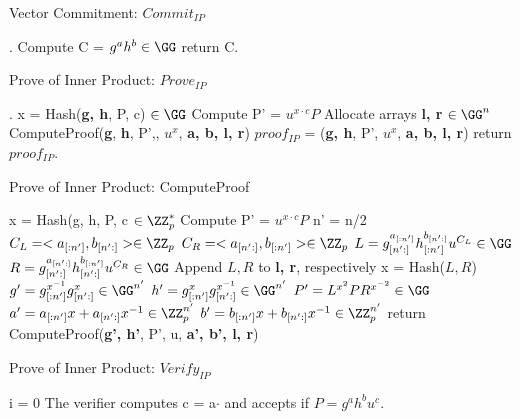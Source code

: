 \begin{algorithm}
 \DontPrintSemicolon
    \caption{Vector Commitment: $Commit_{IP}$}
    \label{alg:vector_commitment}
    \LinesNumbered
    
    .
    Compute C = $g^ah^b \in \GG$ \;
    return C.
\end{algorithm}

\begin{algorithm}
 \DontPrintSemicolon
    \caption{Prove of Inner Product: $Prove_{IP}$}
    \label{alg:prove_ip}
    \LinesNumbered
    
    .
    x = Hash(\textbf{g, h}, P, c) $\in \GG$ \;
    Compute P' = $u^{x\cdot c}P$ \;
    Allocate arrays \textbf{l, r} $\in \GG^n$ \;
    ComputeProof(\textbf{g}, \textbf{h}, P',, $u^x$, \textbf{a, b, l, r})\;
    $proof_{IP}$ = (\textbf{g, h}, P', $u^x$, \textbf{a, b, l, r}) \; 
    return $proof_{IP}$.
\end{algorithm}

\begin{algorithm}
    \caption{Prove of Inner Product: ComputeProof}
    \label{alg:compute_proof}
    \LinesNumbered
    x = Hash(g, h, P, c $\in \ZZ_p^*$\;
    Compute P' = $u^{x\cdot c}P$ \;
     {
        n' = n/2 \;
        $C_L = <a_{[:n']}, b_{[n':]}> \in \ZZ_p$\;
        $C_R = <a_{[n':]}, b_{[:n']}> \in \ZZ_p$\;
        $L = g_{[n':]}^{a_{[:n']}} h_{[:n']}^{b_{[n':]}}u^{C_L} \in \GG$ \;
        $R = g_{[n':]}^{a_{[n':]}} h_{[n':]}^{b_{[:n']}}u^{C_R} \in \GG$ \;
        Append $L, R$ to \textbf{l, r}, respectively\;
        x = Hash($L, R$)\;
        $g' = g_{[:n']}^{x^{-1}} g_{[n':]}^{x} \in \GG^{n'}$ \;
        $h' = g_{[:n']}^{x} g_{[n':]}^{x^{-1}} \in \GG^{n'}$ \;
        $P' = L^{x^2}PR^{x^{-2}} \in \GG$ \;
        $a' = a_{[:n']}x + a_{[n':]}x^{-1} \in \ZZ_p^{n'}$ \;
        $b' = b_{[:n']}x + b_{[n':]}x^{-1} \in \ZZ_p^{n'}$ \;
        return ComputeProof(\textbf{g', h'}, P', u, \textbf{a', b', l, r})
    }
\end{algorithm}

\begin{algorithm}
 \DontPrintSemicolon
    \caption{Prove of Inner Product: $Verify_{IP}$}
    \label{alg:verify_ip}
    \LinesNumbered
    
    
    i = 0 \;
    The verifier computes c = a$\cdot$ and accepts if $P = g^ah^bu^c$.
\end{algorithm}

